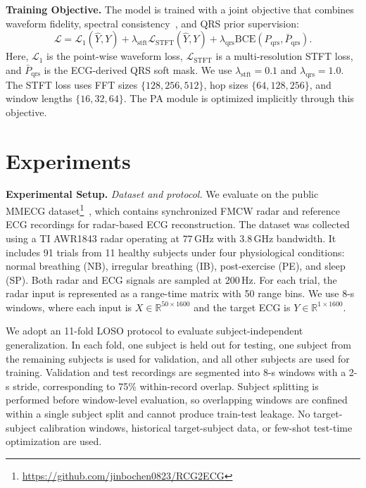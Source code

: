 \documentclass[runningheads]{llncs}
\begin{document}
\noindent\textbf{Training Objective.}
The model is trained with a joint objective that combines waveform fidelity, spectral consistency~\cite{Yamamoto2020stftloss}, and QRS prior supervision:
\begin{equation}
    \mathcal{L}
    =
    \mathcal{L}_{1}(\hat{Y},Y)
    +
    \lambda_{\mathrm{stft}}
    \mathcal{L}_{\mathrm{STFT}}(\hat{Y},Y)
    +
    \lambda_{\mathrm{qrs}}
    \mathrm{BCE}(P_{\mathrm{qrs}},\bar{P}_{\mathrm{qrs}}).
\end{equation}
Here, $\mathcal{L}_{1}$ is the point-wise waveform loss, $\mathcal{L}_{\mathrm{STFT}}$ is a multi-resolution STFT loss, and $\bar{P}_{\mathrm{qrs}}$ is the ECG-derived QRS soft mask. We use $\lambda_{\mathrm{stft}}=0.1$ and $\lambda_{\mathrm{qrs}}=1.0$. The STFT loss uses FFT sizes $\{128,256,512\}$, hop sizes $\{64,128,256\}$, and window lengths $\{16,32,64\}$. The PA module is optimized implicitly through this objective.

\section{Experiments}
\vspace{-0.6em}

\noindent\textbf{Experimental Setup.}
\textit{Dataset and protocol.} We evaluate on the public MMECG dataset\footnote{\url{https://github.com/jinbochen0823/RCG2ECG}}~\cite{chenmmwave}, which contains synchronized FMCW radar and reference ECG recordings for radar-based ECG reconstruction. The dataset was collected using a TI AWR1843 radar operating at $77\,\mathrm{GHz}$ with $3.8\,\mathrm{GHz}$ bandwidth. It includes 91 trials from 11 healthy subjects under four physiological conditions: normal breathing (NB), irregular breathing (IB), post-exercise (PE), and sleep (SP). Both radar and ECG signals are sampled at $200\,\mathrm{Hz}$. For each trial, the radar input is represented as a range-time matrix with 50 range bins. We use 8-s windows, where each input is $X\in\mathbb{R}^{50\times1600}$ and the target ECG is $Y\in\mathbb{R}^{1\times1600}$.

We adopt an 11-fold LOSO protocol to evaluate subject-independent generalization. In each fold, one subject is held out for testing, one subject from the remaining subjects is used for validation, and all other subjects are used for training. Validation and test recordings are segmented into 8-s windows with a 2-s stride, corresponding to 75\% within-record overlap. Subject splitting is performed before window-level evaluation, so overlapping windows are confined within a single subject split and cannot produce train-test leakage. No target-subject calibration windows, historical target-subject data, or few-shot test-time optimization are used.
\end{document}
